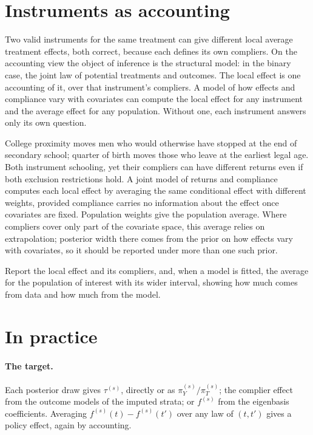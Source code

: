 \section{Instruments as accounting}\label{iv:sec:accounting}

Two valid instruments for the same treatment can give different local average treatment effects, both correct, because each defines its own compliers. On the accounting view the object of inference is the structural model: in the binary case, the joint law of potential treatments and outcomes. The local effect is one accounting of it, over that instrument's compliers. A model of how effects and compliance vary with covariates can compute the local effect for any instrument and the average effect for any population. Without one, each instrument answers only its own question.

College proximity moves men who would otherwise have stopped at the end of secondary school; quarter of birth moves those who leave at the earliest legal age. Both instrument schooling, yet their compliers can have different returns even if both exclusion restrictions hold. A joint model of returns and compliance computes each local effect by averaging the same conditional effect with different weights, provided compliance carries no information about the effect once covariates are fixed. Population weights give the population average. Where compliers cover only part of the covariate space, this average relies on extrapolation; posterior width there comes from the prior on how effects vary with covariates, so it should be reported under more than one such prior.

Report the local effect and its compliers, and, when a model is fitted, the average for the population of interest with its wider interval, showing how much comes from data and how much from the model.

\section{In practice}

\paragraph{The target.} Each posterior draw gives $\tau^{(s)}$, directly or as $\pi_Y^{(s)}/\pi_T^{(s)}$; the complier effect from the outcome models of the imputed strata; or $f^{(s)}$ from the eigenbasis coefficients. Averaging $f^{(s)}(t) - f^{(s)}(t')$ over any law of $(t, t')$ gives a policy effect, again by accounting.

